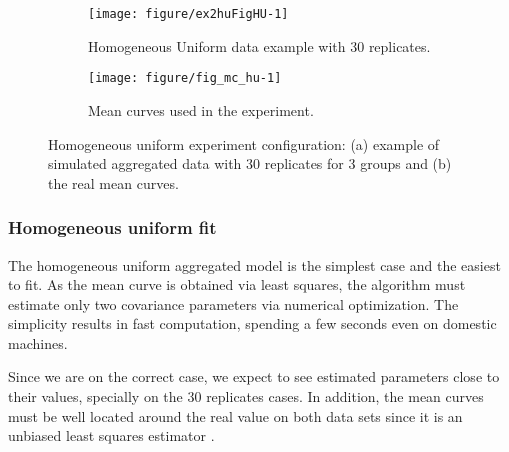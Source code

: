 \begin{figure}[t]
  \begin{subfigure}{\textwidth}
  \centering
\begin{knitrout}
\color{fgcolor}
\texttt{[image: figure/ex2huFigHU-1]} 

\end{knitrout}
  \caption{Homogeneous Uniform data example with 30 replicates.}
  \label{fig:hu-data}
\end{subfigure}
  \begin{subfigure}{\textwidth}
    \centering
\begin{knitrout}
\color{fgcolor}
\texttt{[image: figure/fig\_mc\_hu-1]} 

\end{knitrout}
    \caption{Mean curves used in the experiment.}
    \label{fig:hu-mc}
  \end{subfigure}
\caption{Homogeneous uniform experiment configuration: (a) example of simulated aggregated data with 30 replicates for 3 groups and (b) the real mean curves.}
\end{figure}


\subsubsection{Homogeneous uniform fit}
\label{sec:mpc2hu}


The homogeneous uniform aggregated model is the simplest case and the easiest to fit. As the mean curve is obtained via least squares, the algorithm must estimate only two covariance parameters via numerical optimization. The simplicity results in fast computation, spending a few seconds even on domestic machines.

Since we are on the correct case, we expect to see estimated parameters close to their values, specially on the 30 replicates cases. In addition, the mean curves must be well located around the real value on both data sets since it is an unbiased least squares estimator \cite{shi2011gaussian}.




